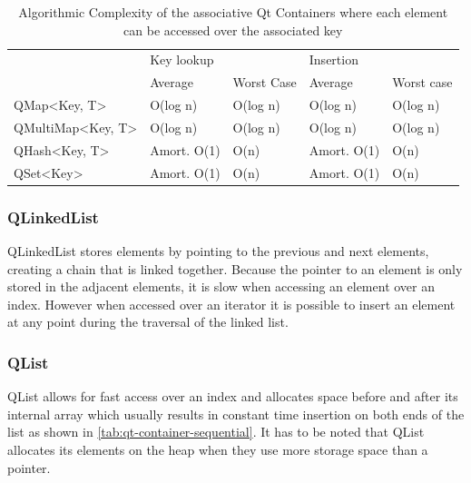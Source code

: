 \begin{table}[!htb]

\centering
\begin{tabular}{@{}|l|l|l|l|l|@{}}
\toprule

\multirow{2}{*}{}                    & \multicolumn{2}{l|}{Key lookup} & \multicolumn{2}{l|}{Insertion} \\ \cmidrule(l){2-5} 
                                     & Average         & Worst Case    & Average        & Worst case    \\ \midrule
QMap\textless Key, T\textgreater      & O(log n)        & O(log n)      & O(log n)       & O(log n)      \\ \midrule
QMultiMap\textless Key, T\textgreater & O(log n)        & O(log n)      & O(log n)       & O(log n)      \\ \midrule
QHash\textless Key, T\textgreater     & Amort. O(1)     & O(n)          & Amort. O(1)    & O(n)          \\ \midrule
QSet\textless Key\textgreater         & Amort. O(1)     & O(n)          & Amort. O(1)    & O(n)          \\ \bottomrule
\end{tabular}
\caption{Algorithmic Complexity of the associative Qt Containers where each element can be accessed over the associated key \cite{QtDoc:Containers}}
\label{tab:qt-container-associative}
\end{table}

\subsubsection{QLinkedList}

QLinkedList stores elements by pointing to the previous and next elements, creating a chain that is linked together. Because the pointer to an element is only stored in the adjacent elements, it is slow when accessing an element over an index. However when accessed over an iterator it is possible to insert an element at any point during the traversal of the linked list.

\subsubsection{QList}
QList allows for fast access over an index and allocates space before and after its internal array which usually results in constant time insertion on both ends of the list as shown in \ref{tab:qt-container-sequential}. It has to be noted that QList allocates its elements on the heap when they use more storage space than a pointer.\cite{QtDoc:QList}
